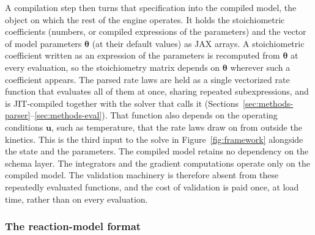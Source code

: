 \documentclass{article}
\begin{document}
A compilation step then turns that specification into the compiled model, the object on which the rest of the engine operates. It holds the stoichiometric coefficients (numbers, or compiled expressions of the parameters) and the vector of model parameters $\boldsymbol{\theta}$ (at their default values) as JAX arrays. A stoichiometric coefficient written as an expression of the parameters is recomputed from $\boldsymbol{\theta}$ at every evaluation, so the stoichiometry matrix depends on $\boldsymbol{\theta}$ wherever such a coefficient appears. The parsed rate laws are held as a single vectorized rate function that evaluates all of them at once, sharing repeated subexpressions, and is JIT-compiled together with the solver that calls it (Sections~\ref{sec:methods-parser}--\ref{sec:methods-eval}). That function also depends on the operating conditions $\mathbf{u}$, such as temperature, that the rate laws draw on from outside the kinetics. This is the third input to the solve in Figure~\ref{fig:framework} alongside the state and the parameters. The compiled model retains no dependency on the schema layer. The integrators and the gradient computations operate only on the compiled model. The validation machinery is therefore absent from these repeatedly evaluated functions, and the cost of validation is paid once, at load time, rather than on every evaluation.

\subsubsection{The reaction-model format}
\label{sec:methods-format}
\end{document}

